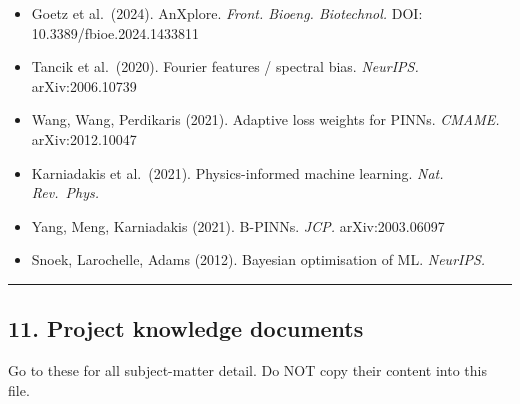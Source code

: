 \documentclass[
]{article}
\providecommand{\tightlist}{%
  \setlength{\itemsep}{0pt}\setlength{\parskip}{0pt}}
\begin{document}
\begin{itemize}
\tightlist
\item
  Goetz et al.~(2024). AnXplore. \emph{Front. Bioeng. Biotechnol.} DOI:
  10.3389/fbioe.2024.1433811
\item
  Tancik et al.~(2020). Fourier features / spectral bias.
  \emph{NeurIPS.} arXiv:2006.10739
\item
  Wang, Wang, Perdikaris (2021). Adaptive loss weights for PINNs.
  \emph{CMAME.} arXiv:2012.10047
\item
  Karniadakis et al.~(2021). Physics-informed machine learning.
  \emph{Nat. Rev.~Phys.}
\item
  Yang, Meng, Karniadakis (2021). B-PINNs. \emph{JCP.} arXiv:2003.06097
\item
  Snoek, Larochelle, Adams (2012). Bayesian optimisation of ML.
  \emph{NeurIPS.}
\end{itemize}

\begin{center}\rule{0.5\linewidth}{0.5pt}\end{center}

\subsection{11. Project knowledge
documents}\label{project-knowledge-documents}

Go to these for all subject-matter detail. Do NOT copy their content
into this file.
\end{document}
